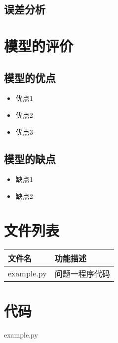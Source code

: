 \documentclass{cumcmthesis}
\begin{document}
\subsection{误差分析}


\section{模型的评价}

\subsection{模型的优点}
\begin{itemize}[itemindent=2em]
\item 优点1
\item 优点2
\item 优点3
\end{itemize}

\subsection{模型的缺点}
\begin{itemize}[itemindent=2em]
\item 缺点1
\item 缺点2
\end{itemize}




\newpage
\begin{appendices}
\section{文件列表}
\begin{table}[H]
\centering
\begin{tabularx}{\textwidth}{LL}
\toprule
文件名   & 功能描述 \\
\midrule
example.py & 问题一程序代码 \\
\bottomrule
\end{tabularx}
\label{tab:文件列表}
\end{table}

\section{代码}
\noindent example.py

\end{appendices}
\end{document}
